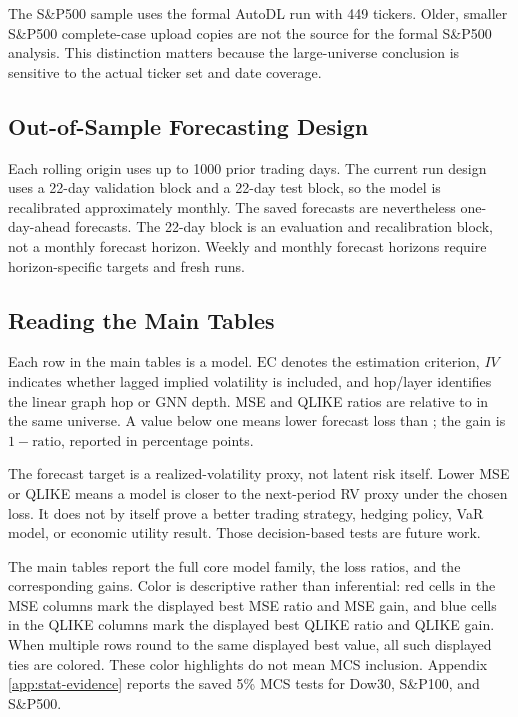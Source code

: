 \documentclass[11pt,a4paper]{article}
\newcommand{\model}[1]{\texttt{\detokenize{#1}}}
\begin{document}
The S\&P500 sample uses the formal AutoDL run with 449 tickers.  Older, smaller S\&P500 complete-case upload copies are not the source for the formal S\&P500 analysis.  This distinction matters because the large-universe conclusion is sensitive to the actual ticker set and date coverage.

\subsection{Out-of-Sample Forecasting Design}
\label{subsec:oos}

Each rolling origin uses up to 1000 prior trading days.  The current run design uses a 22-day validation block and a 22-day test block, so the model is recalibrated approximately monthly.  The saved forecasts are nevertheless one-day-ahead forecasts.  The 22-day block is an evaluation and recalibration block, not a monthly forecast horizon.  Weekly and monthly forecast horizons require horizon-specific targets and fresh runs.

\subsection{Reading the Main Tables}
\label{subsec:reading-tables}

Each row in the main tables is a model.  \(\mathrm{EC}\) denotes the estimation criterion, \(IV\) indicates whether lagged implied volatility is included, and hop/layer identifies the linear graph hop or GNN depth.  MSE and QLIKE ratios are relative to \model{HAR_M} in the same universe.  A value below one means lower forecast loss than \model{HAR_M}; the gain is \(1-\text{ratio}\), reported in percentage points.

The forecast target is a realized-volatility proxy, not latent risk itself.  Lower MSE or QLIKE means a model is closer to the next-period RV proxy under the chosen loss.  It does not by itself prove a better trading strategy, hedging policy, VaR model, or economic utility result.  Those decision-based tests are future work.

The main tables report the full core model family, the loss ratios, and the corresponding gains.  Color is descriptive rather than inferential: red cells in the MSE columns mark the displayed best MSE ratio and MSE gain, and blue cells in the QLIKE columns mark the displayed best QLIKE ratio and QLIKE gain.  When multiple rows round to the same displayed best value, all such displayed ties are colored.  These color highlights do not mean MCS inclusion.  Appendix \ref{app:stat-evidence} reports the saved 5\% MCS tests for Dow30, S\&P100, and S\&P500.
\end{document}
